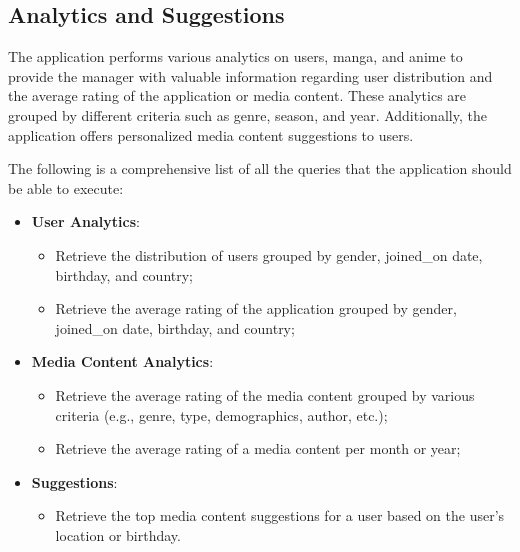 \subsection*{Analytics and Suggestions}

The application performs various analytics on users, manga, and anime to provide the manager with valuable information
regarding user distribution and the average rating of the application or media content. These analytics are grouped
by different criteria such as genre, season, and year. Additionally, the application offers personalized
media content suggestions to users.

\vspace{\baselineskip}

The following is a comprehensive list of all the queries that the application should be able to execute:

\vspace{\baselineskip}

\begin{itemize}
    \item \textbf{User Analytics}:
    \begin{itemize}
        \item Retrieve the distribution of users grouped by gender, joined\_on date, birthday, and country;
        \item Retrieve the average rating of the application grouped by gender, joined\_on date, birthday, and country;
    \end{itemize}

    \item \textbf{Media Content Analytics}:
    \begin{itemize}
        \item Retrieve the average rating of the media content grouped by various criteria (e.g., genre, type, demographics, author, etc.);
        \item Retrieve the average rating of a media content per month or year;
    \end{itemize}

    \item \textbf{Suggestions}:
    \begin{itemize}
        \item Retrieve the top media content suggestions for a user based on the user's location or birthday.
    \end{itemize}
\end{itemize}

\newpage

